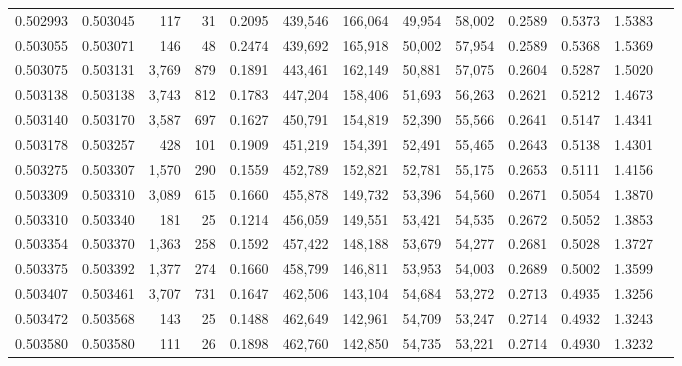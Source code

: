 \begin{tabular}{rrrrrrrrrrrrr}
0.502993 & 0.503045 &   117 &    31 &                                     0.2095 & 439,546 & 166,064 &  49,954 &  58,002 & 0.2589 & 0.5373 & 1.5383 \\
0.503055 & 0.503071 &   146 &    48 &                                     0.2474 & 439,692 & 165,918 &  50,002 &  57,954 & 0.2589 & 0.5368 & 1.5369 \\
0.503075 & 0.503131 & 3,769 &   879 &                                     0.1891 & 443,461 & 162,149 &  50,881 &  57,075 & 0.2604 & 0.5287 & 1.5020 \\
0.503138 & 0.503138 & 3,743 &   812 &                                     0.1783 & 447,204 & 158,406 &  51,693 &  56,263 & 0.2621 & 0.5212 & 1.4673 \\
0.503140 & 0.503170 & 3,587 &   697 &                                     0.1627 & 450,791 & 154,819 &  52,390 &  55,566 & 0.2641 & 0.5147 & 1.4341 \\
0.503178 & 0.503257 &   428 &   101 &                                     0.1909 & 451,219 & 154,391 &  52,491 &  55,465 & 0.2643 & 0.5138 & 1.4301 \\
0.503275 & 0.503307 & 1,570 &   290 &                                     0.1559 & 452,789 & 152,821 &  52,781 &  55,175 & 0.2653 & 0.5111 & 1.4156 \\
0.503309 & 0.503310 & 3,089 &   615 &                                     0.1660 & 455,878 & 149,732 &  53,396 &  54,560 & 0.2671 & 0.5054 & 1.3870 \\
0.503310 & 0.503340 &   181 &    25 &                                     0.1214 & 456,059 & 149,551 &  53,421 &  54,535 & 0.2672 & 0.5052 & 1.3853 \\
0.503354 & 0.503370 & 1,363 &   258 &                                     0.1592 & 457,422 & 148,188 &  53,679 &  54,277 & 0.2681 & 0.5028 & 1.3727 \\
0.503375 & 0.503392 & 1,377 &   274 &                                     0.1660 & 458,799 & 146,811 &  53,953 &  54,003 & 0.2689 & 0.5002 & 1.3599 \\
0.503407 & 0.503461 & 3,707 &   731 &                                     0.1647 & 462,506 & 143,104 &  54,684 &  53,272 & 0.2713 & 0.4935 & 1.3256 \\
0.503472 & 0.503568 &   143 &    25 &                                     0.1488 & 462,649 & 142,961 &  54,709 &  53,247 & 0.2714 & 0.4932 & 1.3243 \\
0.503580 & 0.503580 &   111 &    26 &                                     0.1898 & 462,760 & 142,850 &  54,735 &  53,221 & 0.2714 & 0.4930 & 1.3232 \\

\end{tabular}
